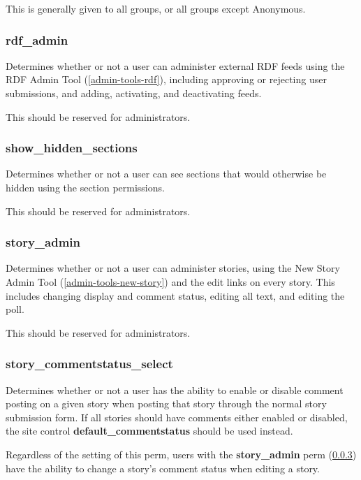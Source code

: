 This is generally given to all groups, or all groups except Anonymous.

\subsubsection{rdf\_admin}
\label{perm-rdf-admin}

Determines whether or not a user can administer external RDF feeds using the RDF Admin Tool (\ref{admin-tools-rdf}), including approving or rejecting user submissions, and adding, activating, and deactivating feeds.

This should be reserved for administrators. 

\subsubsection{show\_hidden\_sections}
\label{perm-show-hidden-sections}

Determines whether or not a user can see sections that would otherwise be hidden using the section permissions.

This should be reserved for administrators.

\subsubsection{story\_admin}
\label{perm-story-admin}

Determines whether or not a user can administer stories, using the New Story Admin Tool (\ref{admin-tools-new-story}) and the edit links on every story.  This includes changing display and comment status, editing all text, and editing the poll.

This should be reserved for administrators.

\subsubsection{story\_commentstatus\_select}
\label{perm-story-commentstatus-select}

Determines whether or not a user has the ability to enable or disable comment posting on a given story when posting that story through the normal story submission form. If all stories should have comments either enabled or disabled, the site control {\bf default\_commentstatus} should be used instead.

Regardless of the setting of this perm, users with the {\bf story\_admin} perm (\ref{perm-story-admin}) have the ability to change a story's comment status when editing a story.

